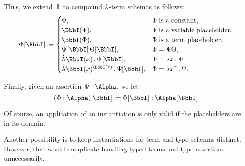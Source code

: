 \begin{definition}
\begin{thmenum}
    Thus, we extend \( \BbbI \) to compound \( {\mathrm \lambda} \)-term schemas as follows:
    \begin{equation}\label{eq:def:lambda_schema_instantiation/terms}
      \Phi[\BbbI] \coloneqq \begin{cases}
        \Phi,                                       &\Phi \T{is a constant},             \\
        \BbbI(\Phi),                                &\Phi \T{is a variable placeholder}, \\
        \BbbI(\Phi),                                &\Phi \T{is a term placeholder},     \\
        \Psi[\BbbI] \thinspace \Theta[\BbbI],       &\Phi = \Psi\Theta,                  \\
        \qabs {\BbbI(x)} \Psi[\BbbI],               &\Phi = \qabs x \Psi,                \\
        \qabs {\BbbI(x)^{\BbbI(\tau)}} \Psi[\BbbI], &\Phi = \qabs {x^\tau} \Psi.
      \end{cases}
    \end{equation}

     Finally, given an assertion \( \Psi: \Alpha \), we let
    \begin{equation}\label{eq:def:lambda_schema_instantiation/assertion}
      (\Phi: \Alpha)[\BbbI] \coloneqq \Phi[\BbbI]: \Alpha[\BbbI]
    \end{equation}
  \end{thmenum}
\end{definition}
\begin{comments}
  \item Of course, an application of an instantiation is only valid if the placeholders are in its domain.

  \item Another possibility is to keep instantiations for term and type schemas distinct. However, that would complicate handling typed terms and type assertions unnecessarily.
\end{comments}

